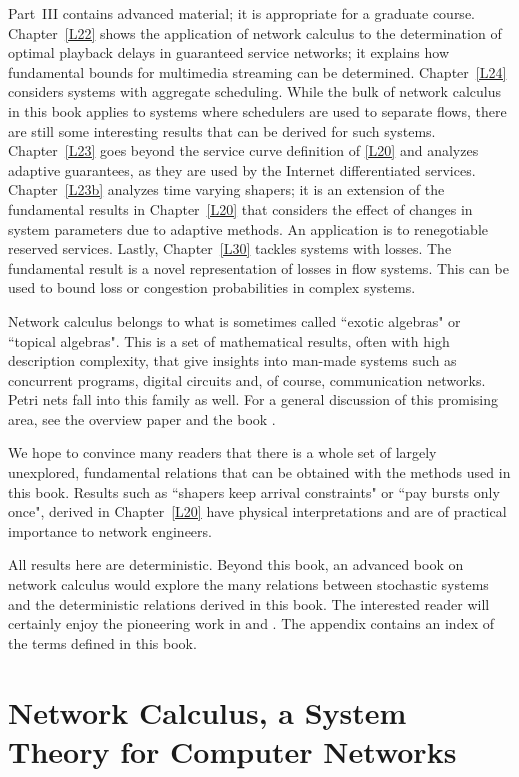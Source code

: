 Part~III contains advanced material; it is  appropriate for a
graduate course. Chapter~\ref{L22} shows the application of
network calculus to the determination of optimal playback delays
in guaranteed service networks; it explains how fundamental bounds
for multimedia streaming can be determined. Chapter~\ref{L24}
considers systems with aggregate scheduling. While the bulk of
network calculus in this book applies to systems where schedulers
are used to separate flows, there are still some interesting
results that can be derived for such systems. Chapter~\ref{L23}
goes beyond the service curve definition of \cref{L20} and
analyzes adaptive guarantees, as they are used by the Internet
differentiated services. Chapter~\ref{L23b} analyzes time varying
shapers; it is an extension of the fundamental results in
Chapter~\ref{L20} that considers the effect of changes in system
parameters due to adaptive methods. An application is to
renegotiable reserved services. Lastly, Chapter~\ref{L30} tackles
systems with losses. The fundamental result is a novel
representation of losses in flow systems. This can be used to
bound loss or congestion probabilities in complex systems.

Network calculus belongs to what is sometimes called ``exotic
algebras" or ``topical algebras". This is a set of mathematical
results, often with high description complexity, that give
insights into man-made systems such as concurrent programs,
digital circuits and, of course, communication networks. Petri
nets fall into this family as well. For a general discussion of
this promising area, see the overview paper \cite{jegu99} and the
book \cite{maxPlus}.

We hope to convince many readers that there is a whole set of
largely unexplored, fundamental relations that can be obtained
with the methods used in this book. Results such as ``shapers keep
arrival constraints" or ``pay bursts only once", derived in
Chapter~\ref{L20} have physical interpretations and are of
practical importance to network engineers.

All results here are deterministic. Beyond this book, an advanced
book on network calculus would explore the many relations between
stochastic systems and the deterministic relations derived in this
book. The interested reader will certainly enjoy the pioneering
work in \cite{maxPlus} and \cite{Changbook}. The appendix contains
an index of the terms defined in this book.

\section*{Network Calculus, a System Theory for Computer
Networks}

